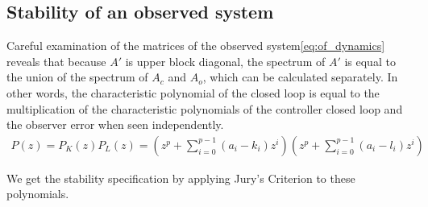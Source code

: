 \documentclass[sigconf]{llncs}
\newcommand{\mat}[1]{{#1}}
\begin{document}
\subsection{Stability of an observed system}\label{sec:cof_stability}

Careful examination of the matrices of the observed system\eqref{eq:of_dynamics} reveals that because $\mat{A}'$ is
upper block diagonal, the spectrum of $\mat{A}'$ is equal to the union of
the spectrum of $\mat{A}_{c}$ and $\mat{A}_{o}$, which can be calculated
separately.  In other words, the characteristic polynomial of the closed loop is
equal to the multiplication of the characteristic polynomials of the controller closed loop
and the observer error when seen independently.
%
\begin{align*}
P(z)=P_K(z)P_L(z)=\left(z^p+\sum_{i=0}^{p-1}{(a_i-k_i)z^{i}}\right) \left(z^p+\sum_{i=0}^{p-1}{(a_i-l_i)z^{i}}\right)
\end{align*}

We get the stability specification by applying Jury's Criterion to these polynomials.
\end{document}
